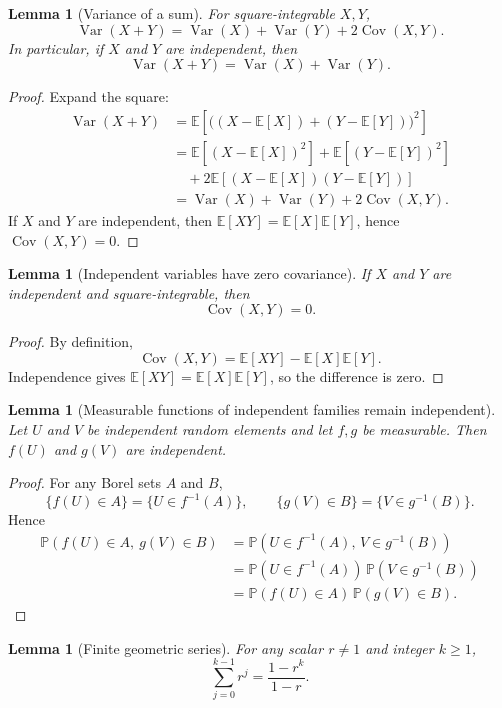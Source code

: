 \documentclass[11pt]{article}
\numberwithin{equation}{section}
\newtheorem{lemma}[theorem]{Lemma}
\theoremstyle{definition}
\theoremstyle{remark}
\newcommand{\E}{\mathbb{E}}
\newcommand{\Var}{\operatorname{Var}}
\newcommand{\Cov}{\operatorname{Cov}}
\begin{document}
\begin{lemma}[Variance of a sum]\label{lem:var_sum}
For square-integrable $X,Y$,
\[
\Var(X+Y)=\Var(X)+\Var(Y)+2\Cov(X,Y).
\]
In particular, if $X$ and $Y$ are independent, then
\[
\Var(X+Y)=\Var(X)+\Var(Y).
\]
\end{lemma}

\begin{proof}
Expand the square:
\begin{align*}
\Var(X+Y)
&=\E\!\left[\big((X-\E[X])+(Y-\E[Y])\big)^2\right] \\
&=\E[(X-\E[X])^2]+\E[(Y-\E[Y])^2] \\
&\quad +2\E[(X-\E[X])(Y-\E[Y])] \\
&=\Var(X)+\Var(Y)+2\Cov(X,Y).
\end{align*}
If $X$ and $Y$ are independent, then $\E[XY]=\E[X]\E[Y]$, hence $\Cov(X,Y)=0$.
\end{proof}

\begin{lemma}[Independent variables have zero covariance]\label{lem:cov_zero}
If $X$ and $Y$ are independent and square-integrable, then
\[
\Cov(X,Y)=0.
\]
\end{lemma}

\begin{proof}
By definition,
\[
\Cov(X,Y)=\E[XY]-\E[X]\E[Y].
\]
Independence gives $\E[XY]=\E[X]\E[Y]$, so the difference is zero.
\end{proof}

\begin{lemma}[Measurable functions of independent families remain independent]\label{lem:meas_func_indep}
Let $U$ and $V$ be independent random elements and let $f,g$ be measurable. Then $f(U)$ and $g(V)$ are independent.
\end{lemma}

\begin{proof}
For any Borel sets $A$ and $B$,
\[
\{f(U)\in A\}=\{U\in f^{-1}(A)\},
\qquad
\{g(V)\in B\}=\{V\in g^{-1}(B)\}.
\]
Hence
\begin{align*}
\mathbb P(f(U)\in A,\ g(V)\in B)
&=\mathbb P(U\in f^{-1}(A),\,V\in g^{-1}(B)) \\
&=\mathbb P(U\in f^{-1}(A))\,\mathbb P(V\in g^{-1}(B)) \\
&=\mathbb P(f(U)\in A)\,\mathbb P(g(V)\in B).
\end{align*}
\end{proof}

\begin{lemma}[Finite geometric series]\label{lem:geom}
For any scalar $r\neq 1$ and integer $k\geq 1$,
\[
\sum_{j=0}^{k-1}r^j = \frac{1-r^k}{1-r}.
\]
\end{lemma}
\end{document}
